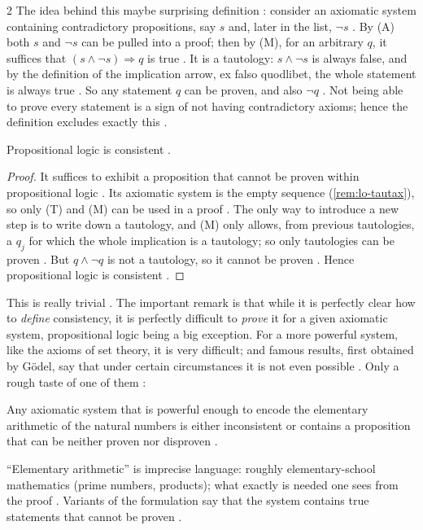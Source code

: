 \begin{paracol}{2}
The idea behind this maybe surprising definition : consider an axiomatic system containing
contradictory propositions, say $s$ and, later in the list, $\neg s$ . By (A) both
$s$ and $\neg s$ can be pulled into a proof; then by (M), for an arbitrary $q$, it suffices that
$(s\wedge\neg s)\Rightarrow q$ is true . It is a tautology: $s\wedge\neg s$ is always false, and by
the definition of the implication arrow, ex falso quodlibet, the whole statement is always true
. So any statement $q$ can be proven, and also $\neg q$ . Not being
able to prove every statement is a sign of not having contradictory axioms; hence the definition excludes exactly
this .

\begin{theorem}\label{thm:lo-propconsistent}
Propositional logic is consistent .
\end{theorem}
\begin{proof}
It suffices to exhibit a proposition that cannot be proven within propositional logic . Its
axiomatic system is the empty sequence (\cref{rem:lo-tautax}), so only (T) and (M) can be used in a proof
. The only way to introduce a new step is to write down a tautology, and (M) only allows, from
previous tautologies, a $q_j$ for which the whole implication is a tautology; so only tautologies can be proven
. But $q\wedge\neg q$ is not a tautology, so it cannot be proven
. Hence propositional logic is consistent .
\end{proof}
This is really trivial . The important remark is that while it is perfectly clear how to
\emph{define} consistency, it is perfectly difficult to \emph{prove} it for a given axiomatic system, propositional
logic being a big exception. For a more powerful system, like the axioms of set theory, it is very difficult; and
famous results, first obtained by G\"odel, say that under certain circumstances it is not even possible
. Only a rough taste of one of them :

\begin{theorem}\label{thm:lo-goedel}
Any axiomatic system that is powerful enough to encode the elementary arithmetic of the natural numbers is either
inconsistent or contains a proposition that can be neither proven nor disproven .
\end{theorem}
``Elementary arithmetic'' is imprecise language: roughly elementary-school mathematics (prime numbers, products);
what exactly is needed one sees from the proof . Variants of the formulation say that the
system contains true statements that cannot be proven .


\end{paracol}
